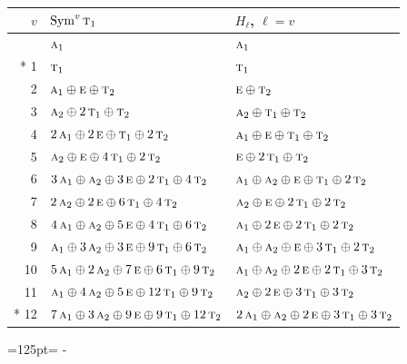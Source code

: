 \documentclass[10pt,a4paper]{article}
\newcommand{\needspace}[1]{\par\penalty-100\begingroup\dimen0=#1\relax\dimen2=\pagegoal
  \advance\dimen2-\pagetotal\ifdim\dimen0>\dimen2\relax\ifdim\dimen2>0pt\vfil\break\fi\fi
  \endgroup}
\numberwithin{equation}{section}
\newcommand{\irr}[1]{\text{\normalfont\scshape #1}}
\begin{document}
{\small\begin{longtable}{@{}rll@{}}\toprule
$v$ & $\operatorname{Sym}^{v}\irr{t}_{1}$ & $H_\ell$, $\ell = v$\\\midrule\endhead
\bottomrule\endfoot\endlastfoot
0 & $\irr{a}_{1}$ & $\irr{a}_{1}$\\*
1 & $\irr{t}_{1}$ & $\irr{t}_{1}$\\
2 & $\irr{a}_{1} \oplus \irr{e} \oplus \irr{t}_{2}$ & $\irr{e} \oplus \irr{t}_{2}$\\
3 & $\irr{a}_{2} \oplus 2\,\irr{t}_{1} \oplus \irr{t}_{2}$ & $\irr{a}_{2} \oplus \irr{t}_{1} \oplus \irr{t}_{2}$\\
4 & $2\,\irr{a}_{1} \oplus 2\,\irr{e} \oplus \irr{t}_{1} \oplus 2\,\irr{t}_{2}$ & $\irr{a}_{1} \oplus \irr{e} \oplus \irr{t}_{1} \oplus \irr{t}_{2}$\\
5 & $\irr{a}_{2} \oplus \irr{e} \oplus 4\,\irr{t}_{1} \oplus 2\,\irr{t}_{2}$ & $\irr{e} \oplus 2\,\irr{t}_{1} \oplus \irr{t}_{2}$\\
6 & $3\,\irr{a}_{1} \oplus \irr{a}_{2} \oplus 3\,\irr{e} \oplus 2\,\irr{t}_{1} \oplus 4\,\irr{t}_{2}$ & $\irr{a}_{1} \oplus \irr{a}_{2} \oplus \irr{e} \oplus \irr{t}_{1} \oplus 2\,\irr{t}_{2}$\\
7 & $2\,\irr{a}_{2} \oplus 2\,\irr{e} \oplus 6\,\irr{t}_{1} \oplus 4\,\irr{t}_{2}$ & $\irr{a}_{2} \oplus \irr{e} \oplus 2\,\irr{t}_{1} \oplus 2\,\irr{t}_{2}$\\
8 & $4\,\irr{a}_{1} \oplus \irr{a}_{2} \oplus 5\,\irr{e} \oplus 4\,\irr{t}_{1} \oplus 6\,\irr{t}_{2}$ & $\irr{a}_{1} \oplus 2\,\irr{e} \oplus 2\,\irr{t}_{1} \oplus 2\,\irr{t}_{2}$\\
9 & $\irr{a}_{1} \oplus 3\,\irr{a}_{2} \oplus 3\,\irr{e} \oplus 9\,\irr{t}_{1} \oplus 6\,\irr{t}_{2}$ & $\irr{a}_{1} \oplus \irr{a}_{2} \oplus \irr{e} \oplus 3\,\irr{t}_{1} \oplus 2\,\irr{t}_{2}$\\
10 & $5\,\irr{a}_{1} \oplus 2\,\irr{a}_{2} \oplus 7\,\irr{e} \oplus 6\,\irr{t}_{1} \oplus 9\,\irr{t}_{2}$ & $\irr{a}_{1} \oplus \irr{a}_{2} \oplus 2\,\irr{e} \oplus 2\,\irr{t}_{1} \oplus 3\,\irr{t}_{2}$\\
11 & $\irr{a}_{1} \oplus 4\,\irr{a}_{2} \oplus 5\,\irr{e} \oplus 12\,\irr{t}_{1} \oplus 9\,\irr{t}_{2}$ & $\irr{a}_{2} \oplus 2\,\irr{e} \oplus 3\,\irr{t}_{1} \oplus 3\,\irr{t}_{2}$\\*
12 & $7\,\irr{a}_{1} \oplus 3\,\irr{a}_{2} \oplus 9\,\irr{e} \oplus 9\,\irr{t}_{1} \oplus 12\,\irr{t}_{2}$ & $2\,\irr{a}_{1} \oplus \irr{a}_{2} \oplus 2\,\irr{e} \oplus 3\,\irr{t}_{1} \oplus 3\,\irr{t}_{2}$\\
\bottomrule\end{longtable}}
\needspace{125pt}
\end{document}
